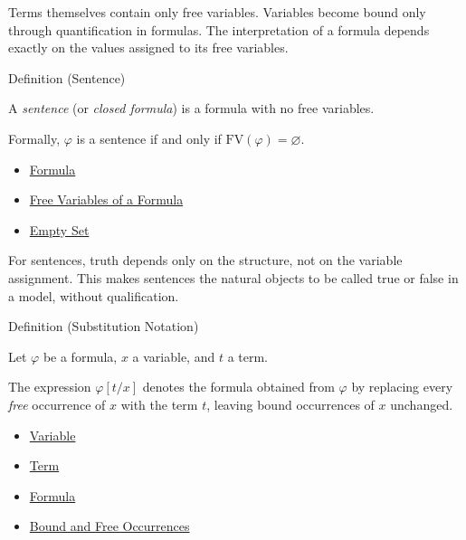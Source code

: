 \begin{remark*}
Terms themselves contain only free variables. Variables become bound only
through quantification in formulas. The interpretation of a formula depends
exactly on the values assigned to its free variables.
\end{remark*}

\begin{definitionbox}{Definition (Sentence)}
\begin{definition}[Sentence]\label{def:sentence}
A \emph{sentence} (or \emph{closed formula}) is a formula with no free variables.

Formally, $\varphi$ is a sentence if and only if $\mathrm{FV}(\varphi) = \varnothing$.
\end{definition}
\end{definitionbox}

\begin{dependencies}
\begin{itemize}
  \item \hyperref[def:formula]{Formula}
  \item \hyperref[def:fv]{Free Variables of a Formula}
  \item \hyperref[def:empty-set]{Empty Set}
\end{itemize}
\end{dependencies}

\begin{remark*}[Consequence]
For sentences, truth depends only on the structure, not on the variable
assignment. This makes sentences the natural objects to be called true or false
in a model, without qualification.
\end{remark*}

\begin{definitionbox}{Definition (Substitution Notation)}
\begin{definition}
\label{def:subst-notation}
Let $\varphi$ be a formula, $x$ a variable, and $t$ a term.

The expression $\varphi[t/x]$ denotes the formula obtained from $\varphi$ by
replacing every \emph{free} occurrence of $x$ with the term $t$, leaving bound
occurrences of $x$ unchanged.
\end{definition}
\begin{dependencies}
\begin{itemize}
  \item \hyperref[def:variable]{Variable}
  \item \hyperref[def:term]{Term}
  \item \hyperref[def:formula]{Formula}
  \item \hyperref[def:bound-free]{Bound and Free Occurrences}
\end{itemize}
\end{dependencies}
\end{definitionbox}

